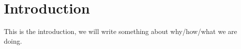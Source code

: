 \section{Introduction}
This is the introduction, we will write something about why/how/what we are doing.

